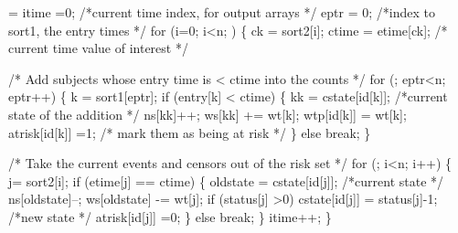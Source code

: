 \documentclass{article}
\begin{document}
\begin{nwchunk}
=
 itime =0; /*current time index, for output arrays */
 eptr  = 0; /*index to sort1, the entry times */
 for (i=0; i<n; ) \{
     ck = sort2[i];
     ctime = etime[ck];  /* current time value of interest */
 
     /* Add subjects whose entry time is < ctime into the counts */
     for (; eptr<n; eptr++) \{
         k = sort1[eptr];
         if (entry[k] < ctime) \{
             kk = cstate[id[k]];  /*current state of the addition */
             ns[kk]++;
             ws[kk] += wt[k];
             wtp[id[k]] = wt[k];
             atrisk[id[k]] =1;   /* mark them as being at risk */
         \}
         else break;
     \}
         
   
     /* Take the current events and censors out of the risk set */
     for (; i<n; i++) \{
         j= sort2[i];
         if (etime[j] == ctime) \{
             oldstate = cstate[id[j]]; /*current state */
             ns[oldstate]--;
             ws[oldstate] -= wt[j];
             if (status[j] >0) cstate[id[j]] = status[j]-1; /*new state */
             atrisk[id[j]] =0;
         \}
         else break;
     \}
     itime++;  
 \}  
\end{nwchunk}
 
\end{document}
